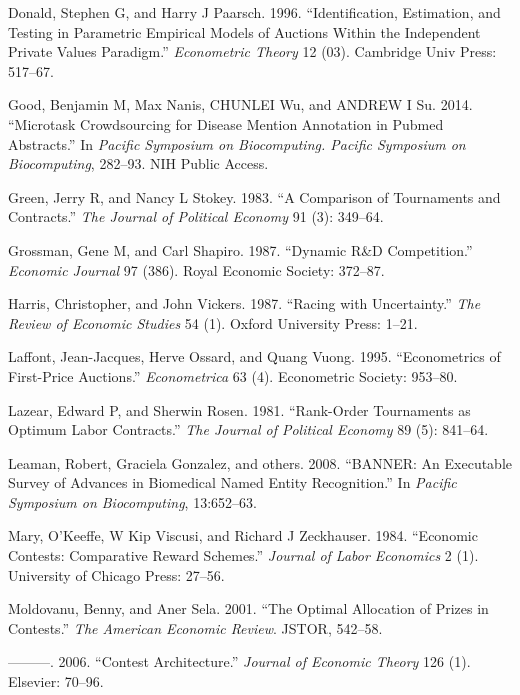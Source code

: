 \documentclass[10pt, titlepage]{article}
\begin{document}
\hypertarget{ref-donald1996identification}{}
Donald, Stephen G, and Harry J Paarsch. 1996. ``Identification,
Estimation, and Testing in Parametric Empirical Models of Auctions
Within the Independent Private Values Paradigm.'' \emph{Econometric
Theory} 12 (03). Cambridge Univ Press: 517--67.

\hypertarget{ref-good2014microtask}{}
Good, Benjamin M, Max Nanis, CHUNLEI Wu, and ANDREW I Su. 2014.
``Microtask Crowdsourcing for Disease Mention Annotation in Pubmed
Abstracts.'' In \emph{Pacific Symposium on Biocomputing. Pacific
Symposium on Biocomputing}, 282--93. NIH Public Access.

\hypertarget{ref-green1983comparison}{}
Green, Jerry R, and Nancy L Stokey. 1983. ``A Comparison of Tournaments
and Contracts.'' \emph{The Journal of Political Economy} 91 (3):
349--64.

\hypertarget{ref-grossman1987dynamic}{}
Grossman, Gene M, and Carl Shapiro. 1987. ``Dynamic R\&D Competition.''
\emph{Economic Journal} 97 (386). Royal Economic Society: 372--87.

\hypertarget{ref-harris1987racing}{}
Harris, Christopher, and John Vickers. 1987. ``Racing with
Uncertainty.'' \emph{The Review of Economic Studies} 54 (1). Oxford
University Press: 1--21.

\hypertarget{ref-laffont1995econometrics}{}
Laffont, Jean-Jacques, Herve Ossard, and Quang Vuong. 1995.
``Econometrics of First-Price Auctions.'' \emph{Econometrica} 63 (4).
Econometric Society: 953--80.

\hypertarget{ref-lazear1981rank}{}
Lazear, Edward P, and Sherwin Rosen. 1981. ``Rank-Order Tournaments as
Optimum Labor Contracts.'' \emph{The Journal of Political Economy} 89
(5): 841--64.

\hypertarget{ref-leaman2008banner}{}
Leaman, Robert, Graciela Gonzalez, and others. 2008. ``BANNER: An
Executable Survey of Advances in Biomedical Named Entity Recognition.''
In \emph{Pacific Symposium on Biocomputing}, 13:652--63.

\hypertarget{ref-mary1984economic}{}
Mary, O'Keeffe, W Kip Viscusi, and Richard J Zeckhauser. 1984.
``Economic Contests: Comparative Reward Schemes.'' \emph{Journal of
Labor Economics} 2 (1). University of Chicago Press: 27--56.

\hypertarget{ref-moldovanu2001optimal}{}
Moldovanu, Benny, and Aner Sela. 2001. ``The Optimal Allocation of
Prizes in Contests.'' \emph{The American Economic Review}. JSTOR,
542--58.

\hypertarget{ref-moldovanu2006contest}{}
---------. 2006. ``Contest Architecture.'' \emph{Journal of Economic
Theory} 126 (1). Elsevier: 70--96.
\end{document}
